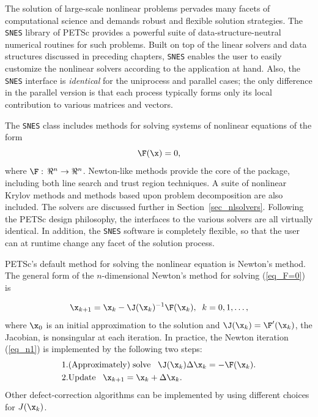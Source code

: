 The solution of large-scale nonlinear problems pervades many facets of
computational science and demands robust and flexible solution
strategies. The \lstinline{SNES} library of PETSc provides a powerful suite of
data-structure-neutral numerical routines for such problems.  Built on
top of the linear solvers and data structures discussed in preceding
chapters, \lstinline{SNES} enables the user to easily customize the nonlinear
solvers according to the application at hand.  Also, the \lstinline{SNES}
interface is {\em identical} for the uniprocess and parallel cases;
the only difference in the parallel version is that each process
typically forms only its local contribution to various matrices and
vectors.

The \lstinline{SNES} class includes methods for solving systems of nonlinear equations of the form
\begin{equation}
\F(\x) = 0,
\label{eq_F=0}
\end{equation}
where $\F: \, \Re^n \to \Re^n$.
Newton-like methods provide the core of the package, including
 both line search 
and trust region  techniques.  A suite of nonlinear Krylov
methods and methods based upon problem decomposition are also included.  The
solvers are discussed further in Section~\ref{sec_nlsolvers}. Following the
PETSc design philosophy, the interfaces to the various solvers are all virtually
identical. In addition, the \lstinline{SNES} software is completely flexible, so that the
user can at runtime change any facet of the solution process.

PETSc's default method for solving the nonlinear equation is Newton's method. The general form of the $n$-dimensional
Newton's method for solving (\ref{eq_F=0}) is

\begin{equation}
     \x_{k+1} = \x_k - \J(\x_k)^{-1} \F(\x_k), \;\; k=0,1, \ldots,
\label{eq_n1}
\end{equation}
where $ \x_0 $ is an initial approximation to the solution and
$ \J(\x_k) = \F'(\x_k) $, the Jacobian, is nonsingular at each iteration.
In practice, the Newton iteration (\ref{eq_n1}) is implemented by
the following two steps:
\begin{eqnarray}
  1. & {\rm (Approximately) \;solve\;\;\;} \J(\x_k) \Delta \x_k = -\F(\x_k).\\
  2. & {\rm Update\;\;\;} \x_{k+1} = \x_k + \Delta \x_k. \hspace{.225in}
\end{eqnarray}
Other defect-correction algorithms can be implemented by using different choices for $J(\x_k)$.

